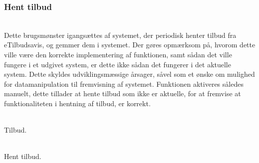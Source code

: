 \subsubsection{Hent tilbud}
\begin{description}[font=\normalfont\itshape]
\item[Brugsmønster]\hfill\\
Dette brugsmønster igangsættes af systemet, der periodisk henter tilbud fra eTilbudsavis, og gemmer dem i systemet.
Der gøres opmærksom på, hvorom dette ville være den korrekte implementering af funktionen, samt sådan det ville fungere i et udgivet system, er dette ikke sådan det fungerer i det aktuelle system.
Dette skyldes udviklingsmæssige årsager, såvel som et ønske om mulighed for datamanipulation til fremvisning af systemet.
Funktionen aktiveres således manuelt, dette tillader at hente tilbud som ikke er aktuelle, for at fremvise at funktionaliteten i hentning af tilbud, er korrekt.
\item[Objekter]\hfill\\
Tilbud.
\item[Funktioner]\hfill\\
Hent tilbud.
\end{description}
